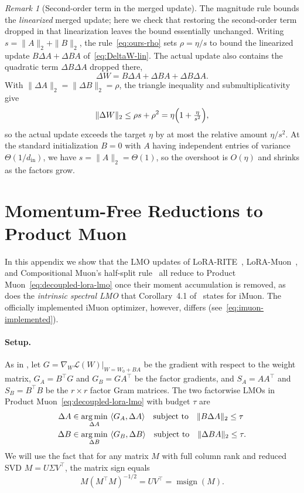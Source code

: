 \documentclass[11pt]{article}
\DeclareMathOperator*{\argmin}{arg\,min}
\newcommand{\ip}[1]{\langle #1 \rangle}
\DeclareMathOperator{\msign}{msign}          %
\newcommand{\norm}[1]{\| #1\|}
\theoremstyle{plain}
\theoremstyle{definition}
\theoremstyle{remark}
\newtheorem{remark}{Remark}
\theoremstyle{definition}
\begin{document}
\begin{remark}[Second-order term in the merged update]
\label{rem:quadratic}
The magnitude rule bounds the \emph{linearized} merged update; here we check that
restoring the second-order term dropped in that linearization leaves the bound
essentially unchanged. Writing $s=\norm{A}_2+\norm{B}_2$, the
rule~\eqref{eq:ours-rho} sets $\rho=\eta/s$ to bound the linearized update
$B\Delta A+\Delta B A$ of~\eqref{eq:DeltaW-lin}. The actual update also contains
the quadratic term $\Delta B\Delta A$ dropped there,
\[
  \Delta W = B\Delta A+\Delta B A+\Delta B\Delta A .
\]
With $\norm{\Delta A}_2=\norm{\Delta B}_2=\rho$, the triangle inequality and
submultiplicativity give
\[
  \norm{\Delta W}_2\le\rho s+\rho^2=\eta\Bigl(1+\tfrac{\eta}{s^2}\Bigr),
\]
so the actual update exceeds the target $\eta$ by at most the relative amount
$\eta/s^2$. At the standard initialization $B=0$ with $A$ having independent
entries of variance $\Theta(1/d_{\mathrm{in}})$, we have $s=\norm{A}_2=\Theta(1)$,
so the overshoot is $O(\eta)$ and shrinks as the factors grow.
\end{remark}


\section{Momentum-Free Reductions to Product Muon}
\label{app:memoryless}
In this appendix we show that the LMO updates of LoRA-RITE~\cite{lorarite}, LoRA-Muon~\cite{loramuon}, and Compositional Muon's half-split rule~\cite{tilde_csd} all reduce to Product Muon~\eqref{eq:decoupled-lora-lmo} once their moment accumulation is removed, as does the \emph{intrinsic spectral LMO} that Corollary~4.1 of~\cite{imuon} states for iMuon. The officially implemented iMuon optimizer, however, differs (see~\eqref{eq:imuon-implemented}).


\paragraph{Setup.} As in , 
let $G=\nabla_W \mathcal{L}(W) \big |_{W=W_0+BA}$ be the gradient with respect to the weight matrix, $G_A=B^\top G$ and $G_B=GA^\top$ be the factor gradients, 
and $S_A=AA^\top$ and
$S_B=B^\top B$ be the $r\times r$ factor Gram matrices.
The two factorwise LMOs in Product Muon~\eqref{eq:decoupled-lora-lmo} with budget $\tau$ are
\begin{equation}
  \begin{aligned}
  \Delta A &\in    \argmin_{\Delta A}~ \ip{G_A, \Delta A} \quad \textnormal{subject to}\quad
\norm{B \Delta A}_2\le\tau \\
\Delta B &\in   \argmin_{\Delta B}~ \ip{G_B,  \Delta B} \quad \textnormal{subject to}\quad  \norm{\Delta B A}_2\le\tau.
  \end{aligned}
  \label{eq:decoupled-lora-lmo-app} 
\end{equation}
We will use the fact that for any matrix $M$ with full column rank and reduced SVD $M=U\Sigma V^\top$,
the matrix sign equals
\begin{equation}
  M(M^\top M)^{-1/2}=
  UV^\top=\msign(M).
  \label{eq:polar-id}
\end{equation}
\end{document}
